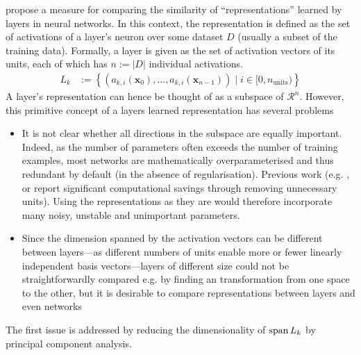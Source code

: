 \citet{raghu2017svcca} propose a measure for comparing the similarity of
``representations'' learned by layers in neural networks. In this context, the
representation is defined as the set of activations of a layer's neuron over
some dataset $D$ (usually a subset of the training data). Formally, a layer is given
as the set of activation vectors of its units, each of which has $n := |D|$ individual
activations.
\begin{align}
    L_k & :=  \left\{ (a_{k,i}(\mathbf{x}_0), \ldots, a_{k,i}(\mathbf{x}_{n-1})) \mid i \in [0,n_\text{units})\right\}
\end{align}
A layer's representation can hence be thought of as a subspace of
$\mathcal{R}^n$. However, this primitive concept of a layers learned
representation has several problems
\begin{itemize}
    \item It is not clear whether all directions in the subspace are equally
        important. Indeed, as the number of parameters often exceeds the number
        of training examples, most networks are mathematically overparameterised
        and thus redundant by default (in the absence of regularisation).
        Previous work (e.g. \citep{lecun1990optimal}, \citep{srinivas2015data}
        or \citep{molchanov2016pruning} report significant computational savings
        through removing unnecessary units). Using the representations as they
        are would therefore incorporate many noisy, unstable and unimportant
        parameters.
    \item Since the dimension spanned by the activation vectors can be different
        between layers---as different numbers of units enable more or fewer
        linearly independent basis vectors---layers of different size could not
        be straightforwardly compared e.g. by finding an transformation from one
        space to the other, but it is desirable to compare representations
        between layers and even networks
\end{itemize}

The first issue is addressed by reducing the dimensionality of $\operatorname{span}{L_k}$ by
principal component analysis.

